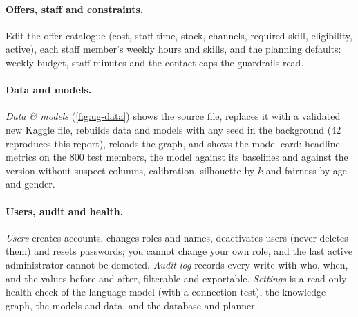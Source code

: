 \paragraph{Offers, staff and constraints.} Edit the offer catalogue (cost, staff time, stock, channels, required skill, eligibility, active), each staff member's weekly hours and skills, and the planning defaults: weekly budget, staff minutes and the contact caps the guardrails read.

\paragraph{Data and models.} \emph{Data \& models} (\cref{fig:ug-data}) shows the source file, replaces it with a validated new Kaggle file, rebuilds data and models with any seed in the background (42 reproduces this report), reloads the graph, and shows the model card: headline metrics on the 800 test members, the model against its baselines and against the version without suspect columns, calibration, silhouette by $k$ and fairness by age and gender.

\paragraph{Users, audit and health.} \emph{Users} creates accounts, changes roles and names, deactivates users (never deletes them) and resets passwords; you cannot change your own role, and the last active administrator cannot be demoted. \emph{Audit log} records every write with who, when, and the values before and after, filterable and exportable. \emph{Settings} is a read-only health check of the language model (with a connection test), the knowledge graph, the models and data, and the database and planner.
